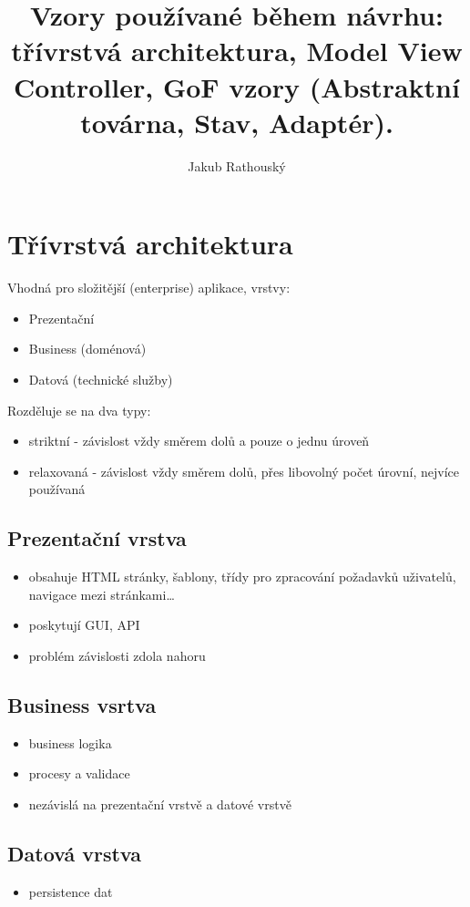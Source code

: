 \documentclass{szzclass}
\title{Vzory používané během návrhu: třívrstvá architektura, Model View Controller, GoF vzory (Abstraktní továrna, Stav, Adaptér).}
\author{Jakub Rathouský}
\begin{document}
\maketitle
\tableofcontents
\newpage

\section{Třívrstvá architektura}
Vhodná pro složitější (enterprise) aplikace, vrstvy:
\begin{itemize}
    \item Prezentační
    \item Business (doménová)
    \item Datová (technické služby)
\end{itemize}

Rozděluje se na dva typy:
\begin{itemize}
    \item striktní - závislost vždy směrem dolů a pouze o jednu úroveň
    \item relaxovaná - závislost vždy směrem dolů, přes libovolný počet úrovní, nejvíce používaná
\end{itemize}
\subsection{Prezentační vrstva}
\begin{itemize}
    \item obsahuje HTML stránky, šablony, třídy pro zpracování požadavků uživatelů, navigace mezi stránkami\dots
    \item poskytují GUI, API
    \item problém závislosti zdola nahoru
\end{itemize}
\subsection{Business vsrtva}
\begin{itemize}
    \item business logika
    \item procesy a validace
    \item nezávislá na prezentační vrstvě a datové vrstvě
\end{itemize}
\subsection{Datová vrstva}
\begin{itemize}
    \item persistence dat
\end{itemize}
\end{document}
